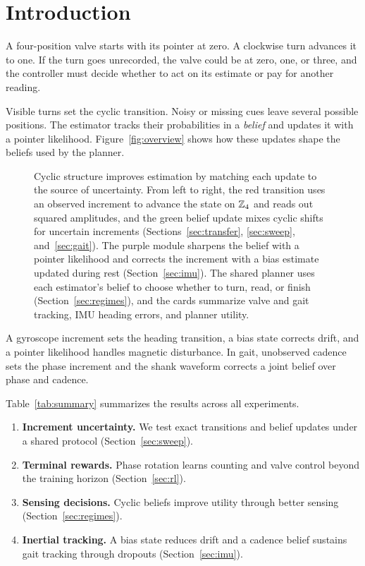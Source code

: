 \section{Introduction}
\label{sec:intro}

A four-position valve starts with its pointer at zero. A clockwise turn
advances it to one. If the turn goes unrecorded, the valve could be at zero,
one, or three, and the controller must decide whether to act on its estimate
or pay for another reading.

Visible turns set the cyclic transition. Noisy or missing cues leave several
possible positions. The estimator tracks their probabilities in a
\emph{belief} and updates it with a pointer likelihood. Figure~\ref{fig:overview}
shows how these updates shape the beliefs used by the planner.

\begin{figure}[!htbp]
\centering

\caption{Cyclic structure improves estimation by matching each update to the
source of uncertainty. From left to right, the red transition uses an
observed increment to advance the state on $\mathbb{Z}_4$ and reads out squared
amplitudes, and the green belief update mixes cyclic shifts for uncertain
increments (Sections~\ref{sec:transfer}, \ref{sec:sweep}, and~\ref{sec:gait}).
The purple module sharpens the belief with a pointer likelihood and corrects
the increment with a bias estimate updated during rest (Section~\ref{sec:imu}).
The shared planner uses each estimator's belief to choose whether to turn,
read, or finish (Section~\ref{sec:regimes}), and the cards summarize valve
and gait tracking, IMU heading errors, and planner utility.}
\label{fig:overview}
\label{fig:method}
\end{figure}

A gyroscope increment sets the heading transition, a bias state corrects
drift, and a pointer likelihood handles magnetic disturbance. In gait,
unobserved cadence sets the phase increment and the shank waveform corrects
a joint belief over phase and cadence.

Table~\ref{tab:summary} summarizes the results across all experiments.

\begin{enumerate}
\item \textbf{Increment uncertainty.} We test exact transitions and belief
updates under a shared protocol (Section~\ref{sec:sweep}).
\item \textbf{Terminal rewards.} Phase rotation learns counting and valve
control beyond the training horizon (Section~\ref{sec:rl}).
\item \textbf{Sensing decisions.} Cyclic beliefs improve utility through
better sensing (Section~\ref{sec:regimes}).
\item \textbf{Inertial tracking.} A bias state reduces drift and a cadence
belief sustains gait tracking through dropouts (Section~\ref{sec:imu}).
\end{enumerate}


